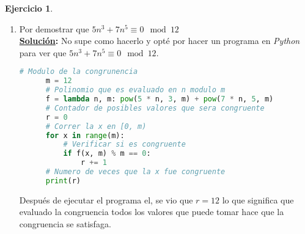\documentclass[11pt,letterpaper]{article}
\theoremstyle{definition}\newtheorem{p}{Ejercicio}
\newcommand{\sol}{\textbf{\underline{Solución}: }} %
\begin{document}
\begin{p}
\begin{enumerate}
    \item Por demostrar que $5n^3+7n^5 \equiv 0 \mod{12}$\\
    \sol No supe como hacerlo y opté por hacer un programa en \textit{Python} para ver que
    $5n^3+7n^5 \equiv 0 \mod{12}$.
    \begin{lstlisting}[language=Python]
      # Modulo de la congrunencia
      m = 12
      # Polinomio que es evaluado en n modulo m
      f = lambda n, m: pow(5 * n, 3, m) + pow(7 * n, 5, m)
      # Contador de posibles valores que sera congruente
      r = 0
      # Correr la x en [0, m)
      for x in range(m):
          # Verificar si es congruente
          if f(x, m) % m == 0:
              r += 1
      # Numero de veces que la x fue congruente
      print(r)      
    \end{lstlisting}
    Después de ejecutar el programa el, se vio que $r=12$ lo que significa que evaluado la congruencia
    todos los valores que puede tomar hace que la congruencia se satisfaga.
\end{enumerate}

\end{p}
\end{document}
